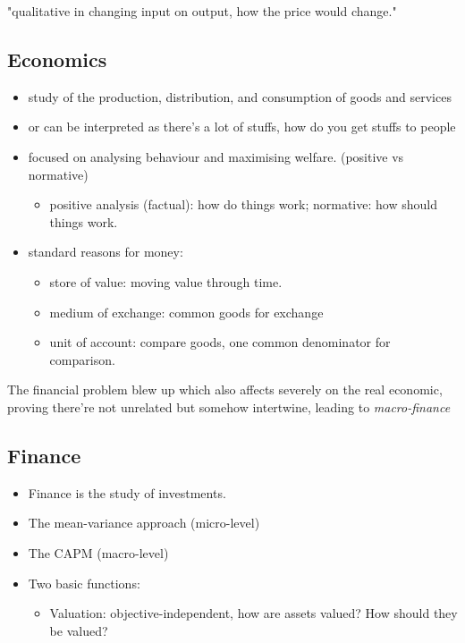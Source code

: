 "qualitative in changing input on output, how the price would change." \par 
\begin{multicols}{2}
\subsection{Economics}
\begin{itemize}
    \item study of the production, distribution, and consumption of goods and services
    \item or can be interpreted as there's a lot of stuffs, how do you get stuffs to people
    \item focused on analysing behaviour and maximising welfare. (positive vs normative)
    \begin{itemize}
        \item positive analysis (factual): how do things work; normative: how should things work.
    \end{itemize}
    \item standard reasons for money:
    \begin{itemize}
        \item store of value: moving value through time. 
        \item medium of exchange: common goods for exchange
        \item unit of account: compare goods, one common denominator for comparison. 
    \end{itemize}
\end{itemize}

\par
The financial problem blew up which also affects severely on the real economic, proving there're not unrelated but somehow intertwine, leading to \textit{macro-finance}

\subsection{Finance}
\begin{itemize}
    \item Finance is the study of investments. 
    \item The mean-variance approach (micro-level)
    \item The CAPM (macro-level)
    \item Two basic functions:
    \begin{itemize}
        \item Valuation: objective-independent, how are assets valued? How should they be valued?
    \end{itemize}
\end{itemize}


\end{multicols}
